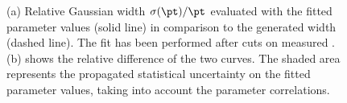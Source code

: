 \documentclass[a4paper]{cmspaper} %
\begin{document}
\begin{figure}[ht]
  \begin{center}
     
  \end{center}
  \caption{(a) Relative Gaussian width $\sigma(\pt)/\pt$ evaluated with the fitted
    parameter values (solid line) in comparison to the generated width
    (dashed line). The fit has been performed after cuts on measured \pt. (b) shows
    the relative difference of the two curves. The shaded area represents the propagated statistical
    uncertainty on the fitted parameter values, taking into account the
    parameter correlations.}
  \label{fig:resFit:toyMC:ptCuts:sigma}
\end{figure}
\end{document}
